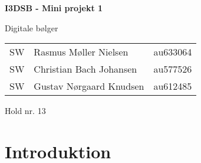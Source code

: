 \documentclass{article}
\begin{document}

\begin{titlepage}
    
    \begin{center}
        \vspace*{1cm}
 
        \Huge
        \textbf{I3DSB - Mini projekt 1}
 
        \vspace{0.5cm}
        \huge
        Digitale bølger \\
        \date\today
 
        \vspace{1.5cm}
 
        \large
        \begin{tabular}{c|lr}
            \hline
        SW & Rasmus Møller Nielsen & au633064 \\
	    SW & Christian Bach Johansen & au577526\\ 
        SW & Gustav Nørgaard Knudsen & au612485 \\
        \hline
        \end{tabular}
        
        
        \vfill
        \vspace{2cm}
 
        Hold nr. 13
 
    \end{center}
\end{titlepage}

\newpage
\newpage

\setcounter{page}{1}


\section{Introduktion}





\end{document}

